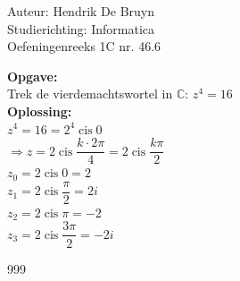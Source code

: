 \documentclass[a4paper]{article}
\newcommand{\cis}{\operatorname{cis}}
\begin{document}
  
\noindent \large Auteur: Hendrik De Bruyn \\
\noindent \large Studierichting: Informatica\\
\noindent \large Oefeningenreeks 1C nr. 46.6\\

\medskip

\normalsize

\textbf{Opgave:} \\

Trek de vierdemachtswortel in $\mathbb{C}$: $z^4 = 16$ \\

\textbf{Oplossing:} \\

$z^4 = 16 = 2^4 \cis 0$ \\

$\Rightarrow z = 2 \cis \dfrac{k\cdot2\pi}{4} = 2 \cis \dfrac{k\pi}{2}$ \\

$z_0 = 2 \cis 0 = 2$ \\

$z_1 = 2 \cis \dfrac{\pi}{2} = 2i$ \\

$z_2 = 2 \cis \pi = -2$ \\

$z_3 = 2 \cis \dfrac{3\pi}{2} = -2i$ \\

\begin{thebibliography}{999}
\end{thebibliography}
\end{document}
